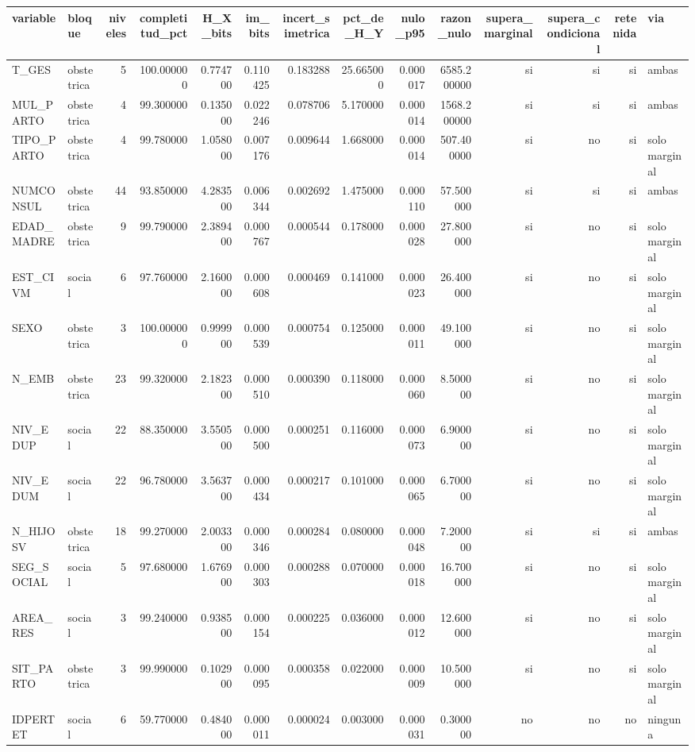 \begin{tabular}{llrrrrrrrrrrrl}
\toprule
variable & bloque & niveles & completitud\_pct & H\_X\_bits & im\_bits & incert\_simetrica & pct\_de\_H\_Y & nulo\_p95 & razon\_nulo & supera\_marginal & supera\_condicional & retenida & via \\
\midrule
T\_GES & obstetrica & 5 & 100.000000 & 0.774700 & 0.110425 & 0.183288 & 25.665000 & 0.000017 & 6585.200000 & si & si & si & ambas \\
MUL\_PARTO & obstetrica & 4 & 99.300000 & 0.135000 & 0.022246 & 0.078706 & 5.170000 & 0.000014 & 1568.200000 & si & si & si & ambas \\
TIPO\_PARTO & obstetrica & 4 & 99.780000 & 1.058000 & 0.007176 & 0.009644 & 1.668000 & 0.000014 & 507.400000 & si & no & si & solo marginal \\
NUMCONSUL & obstetrica & 44 & 93.850000 & 4.283500 & 0.006344 & 0.002692 & 1.475000 & 0.000110 & 57.500000 & si & si & si & ambas \\
EDAD\_MADRE & obstetrica & 9 & 99.790000 & 2.389400 & 0.000767 & 0.000544 & 0.178000 & 0.000028 & 27.800000 & si & no & si & solo marginal \\
EST\_CIVM & social & 6 & 97.760000 & 2.160000 & 0.000608 & 0.000469 & 0.141000 & 0.000023 & 26.400000 & si & no & si & solo marginal \\
SEXO & obstetrica & 3 & 100.000000 & 0.999900 & 0.000539 & 0.000754 & 0.125000 & 0.000011 & 49.100000 & si & no & si & solo marginal \\
N\_EMB & obstetrica & 23 & 99.320000 & 2.182300 & 0.000510 & 0.000390 & 0.118000 & 0.000060 & 8.500000 & si & no & si & solo marginal \\
NIV\_EDUP & social & 22 & 88.350000 & 3.550500 & 0.000500 & 0.000251 & 0.116000 & 0.000073 & 6.900000 & si & no & si & solo marginal \\
NIV\_EDUM & social & 22 & 96.780000 & 3.563700 & 0.000434 & 0.000217 & 0.101000 & 0.000065 & 6.700000 & si & no & si & solo marginal \\
N\_HIJOSV & obstetrica & 18 & 99.270000 & 2.003300 & 0.000346 & 0.000284 & 0.080000 & 0.000048 & 7.200000 & si & si & si & ambas \\
SEG\_SOCIAL & social & 5 & 97.680000 & 1.676900 & 0.000303 & 0.000288 & 0.070000 & 0.000018 & 16.700000 & si & no & si & solo marginal \\
AREA\_RES & social & 3 & 99.240000 & 0.938500 & 0.000154 & 0.000225 & 0.036000 & 0.000012 & 12.600000 & si & no & si & solo marginal \\
SIT\_PARTO & obstetrica & 3 & 99.990000 & 0.102900 & 0.000095 & 0.000358 & 0.022000 & 0.000009 & 10.500000 & si & no & si & solo marginal \\
IDPERTET & social & 6 & 59.770000 & 0.484000 & 0.000011 & 0.000024 & 0.003000 & 0.000031 & 0.300000 & no & no & no & ninguna \\
\bottomrule
\end{tabular}
